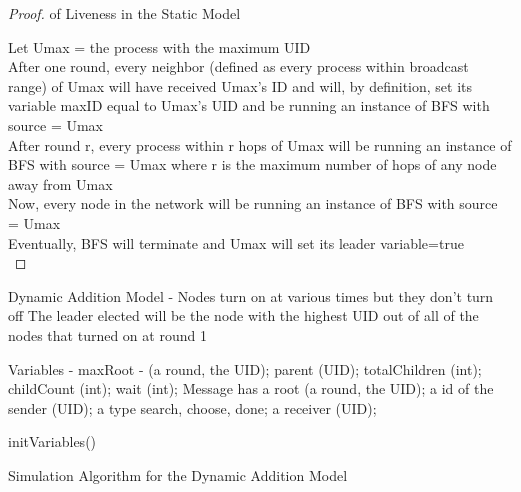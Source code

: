 \documentclass[english]{article}
\begin{document}
\begin{proof} of Liveness in the Static Model

  Let Umax = the process with the maximum UID  \\
  After one round, every neighbor (defined as every process within broadcast range) of Umax will have received Umax’s ID and will, by definition, set its variable maxID equal to Umax’s UID and be running an instance of BFS with source = Umax \\
  After round r, every process within r hops of Umax will be running an instance of BFS with source = Umax where r is the maximum number of hops of any node away from Umax \\
  Now, every node in the network will be running an instance of BFS with source = Umax \\
  Eventually, BFS will terminate and Umax will set its leader variable=true \\

\end{proof}


Dynamic Addition Model - Nodes turn on at various times but they don't turn off 
The leader elected will be the node with the highest UID out of all of the nodes that turned on at round 1

Variables - maxRoot - (a round, the UID); parent (UID); totalChildren (int); childCount (int); wait (int);
Message has a root (a round, the UID); a id of the sender (UID); a type {search, choose, done}; a receiver (UID);

\begin{algorithm}
  initVariables() \;

  \caption{Simulation Algorithm for the Dynamic Addition Model}
\end{algorithm}
\end{document}
